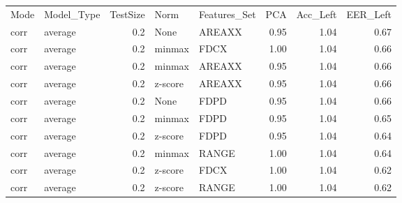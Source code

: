 \begin{tabular}{llrllrrr}
\toprule
Mode & Model\_Type &  TestSize &    Norm & Features\_Set &  PCA &  Acc\_Left &  EER\_Left \\
corr &    average &       0.2 &    None &       AREAXX & 0.95 &      1.04 &      0.67 \\
\midrule
corr &    average &       0.2 &  minmax &         FDCX & 1.00 &      1.04 &      0.66 \\
corr &    average &       0.2 &  minmax &       AREAXX & 0.95 &      1.04 &      0.66 \\
corr &    average &       0.2 & z-score &       AREAXX & 0.95 &      1.04 &      0.66 \\
corr &    average &       0.2 &    None &         FDPD & 0.95 &      1.04 &      0.66 \\
corr &    average &       0.2 &  minmax &         FDPD & 0.95 &      1.04 &      0.65 \\
corr &    average &       0.2 & z-score &         FDPD & 0.95 &      1.04 &      0.64 \\
corr &    average &       0.2 &  minmax &        RANGE & 1.00 &      1.04 &      0.64 \\
corr &    average &       0.2 & z-score &         FDCX & 1.00 &      1.04 &      0.62 \\
corr &    average &       0.2 & z-score &        RANGE & 1.00 &      1.04 &      0.62 \\
\bottomrule
\end{tabular}
